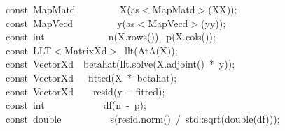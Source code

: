 \documentclass[shortnames,article,nojss]{jss}
\newcommand{\hlstd}[1]{\textcolor[rgb]{0,0,0}{#1}}
\newcommand{\hlopt}[1]{\textcolor[rgb]{0,0,0}{#1}}
\newcommand{\hlkwb}[1]{\textcolor[rgb]{0.13,0.54,0.13}{#1}}
\newcommand{\hlkwd}[1]{\textcolor[rgb]{0,0,0}{#1}}
\begin{document}
\begin{figure}[tbh]
  \noindent
  \ttfamily
  \hlstd{}\hlkwb{const\ }\hlstd{MapMatd}\hlstd{\ \ \ \ \ \ \ \ \ }\hlstd{}\hlkwd{X}\hlstd{}\hlopt{(}\hlstd{as}\hlopt{$<$}\hlstd{MapMatd}\hlopt{$>$(}\hlstd{XX}\hlopt{));}\hspace*{\fill}\\
  \hlstd{}\hlkwb{const\ }\hlstd{MapVecd}\hlstd{\ \ \ \ \ \ \ \ \ }\hlstd{}\hlkwd{y}\hlstd{}\hlopt{(}\hlstd{as}\hlopt{$<$}\hlstd{MapVecd}\hlopt{$>$(}\hlstd{yy}\hlopt{));}\hspace*{\fill}\\
  \hlstd{}\hlkwb{const\ int}\hlstd{\ \ \ \ \ \ \ \ \ \ \ \ \ }\hlkwb{}\hlstd{}\hlkwd{n}\hlstd{}\hlopt{(}\hlstd{X}\hlopt{.}\hlstd{}\hlkwd{rows}\hlstd{}\hlopt{()),\ }\hlstd{}\hlkwd{p}\hlstd{}\hlopt{(}\hlstd{X}\hlopt{.}\hlstd{}\hlkwd{cols}\hlstd{}\hlopt{());}\hspace*{\fill}\\
  \hlstd{}\hlkwb{const\ }\hlstd{LLT}\hlopt{$<$}\hlstd{MatrixXd}\hlopt{$>$\ }\hlstd{}\hlkwd{llt}\hlstd{}\hlopt{(}\hlstd{}\hlkwd{AtA}\hlstd{}\hlopt{(}\hlstd{X}\hlopt{));}\hspace*{\fill}\\
  \hlstd{}\hlkwb{const\ }\hlstd{VectorXd}\hlstd{\ \ }\hlstd{}\hlkwd{betahat}\hlstd{}\hlopt{(}\hlstd{llt}\hlopt{.}\hlstd{}\hlkwd{solve}\hlstd{}\hlopt{(}\hlstd{X}\hlopt{.}\hlstd{}\hlkwd{adjoint}\hlstd{}\hlopt{()\ {*}\ }\hlstd{y}\hlopt{));}\hspace*{\fill}\\
  \hlstd{}\hlkwb{const\ }\hlstd{VectorXd}\hlstd{\ \ \ }\hlstd{}\hlkwd{fitted}\hlstd{}\hlopt{(}\hlstd{X\ }\hlopt{{*}\ }\hlstd{betahat}\hlopt{);}\hspace*{\fill}\\
  \hlstd{}\hlkwb{const\ }\hlstd{VectorXd}\hlstd{\ \ \ \ }\hlstd{}\hlkwd{resid}\hlstd{}\hlopt{(}\hlstd{y\ }\hlopt{{-}\ }\hlstd{fitted}\hlopt{);}\hspace*{\fill}\\
  \hlstd{}\hlkwb{const\ int}\hlstd{\ \ \ \ \ \ \ \ \ \ \ \ }\hlkwb{}\hlstd{}\hlkwd{df}\hlstd{}\hlopt{(}\hlstd{n\ }\hlopt{{-}\ }\hlstd{p}\hlopt{);}\hspace*{\fill}\\
  \hlstd{}\hlkwb{const\ double}\hlstd{\ \ \ \ \ \ \ \ \ \ }\hlkwb{}\hlstd{}\hlkwd{s}\hlstd{}\hlopt{(}\hlstd{resid}\hlopt{.}\hlstd{}\hlkwd{norm}\hlstd{}\hlopt{()\ /\ }\hlstd{std}\hlopt{::}\hlstd{}\hlkwd{sqrt}\hlstd{}\hlopt{(}\hlstd{}\hlkwb{double}\hlstd{}\hlopt{(}\hlstd{df}\hlopt{)));}\hspace*{\fill}\\

\end{figure}
\end{document}
